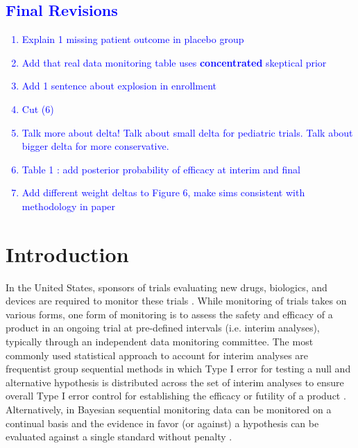 \documentclass[AMA,STIX1COL,doublespace]{WileyNJD-v2}
\begin{document}

\textcolor{blue}{
\section*{Final Revisions}
\begin{enumerate}
\item Explain 1 missing patient outcome in placebo group
\item Add that real data monitoring table uses \textbf{concentrated} skeptical prior
\item Add 1 sentence about explosion in enrollment
\item Cut (6)
\item Talk more about delta! Talk about small delta for pediatric trials. Talk about bigger delta for more conservative.
\item Table 1 : add posterior probability of efficacy at interim and final
\item Add different weight deltas to Figure 6, make sims consistent with methodology in paper
\end{enumerate}
}
\section{Introduction}

In the United States, sponsors of trials evaluating new drugs, biologics, and devices are required to monitor these trials \citep{FDA2006}. 
%
While monitoring of trials takes on various forms, one form of monitoring is to assess the safety and efficacy of a product in an ongoing trial at pre-defined intervals (i.e. interim analyses), typically through an independent data monitoring committee. 
%
The most commonly used statistical approach to account for interim analyses are frequentist group sequential methods in which Type I error for testing a null and alternative hypothesis is distributed across the set of interim analyses to ensure overall Type I error control for establishing the efficacy or futility of a product \citep{Jennison2000}.  
%
Alternatively, in Bayesian sequential monitoring data can be monitored on a continual basis and the evidence in favor (or against) a hypothesis can be evaluated against a single standard without penalty \citep{Spiegelhalter1993}. %
\end{document}
